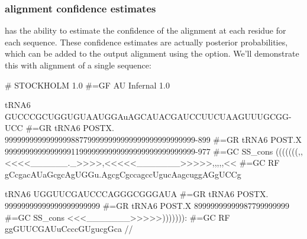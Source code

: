 \subsubsection{alignment confidence estimates}
 has the ability to estimate the confidence of the
alignment at each residue for each sequence. These confidence estimates
are actually posterior probabilities, which can be added to
the output alignment using the  option. We'll demonstrate
this with alignment of a single sequence:

{\samepage
\begin{sreoutput}
# STOCKHOLM 1.0
#=GF AU Infernal 1.0

tRNA6             GUCCCGCUGGUGUAAUGGAuAGCAUACGAUCCUUCUAAGUUUGCGG-UCC
#=GR tRNA6 POSTX. 9999999999999999887799999999999999999999999999-899
#=GR tRNA6 POST.X 9999999999999999119999999999999999999999999999-977
#=GC SS_cons      (((((((,,<<<<______._>>>>,<<<<<_______>>>>>,,,,,<<
#=GC RF           gCcgacAUaGcgcAgUGGu.AgcgCgccagccUgucAagcuggAGgUCCg

tRNA6             UGGUUCGAUCCCAGGGCGGGAUA
#=GR tRNA6 POSTX. 99999999999999999999999
#=GR tRNA6 POST.X 89999999999987799999999
#=GC SS_cons      <<<_______>>>>>))))))):
#=GC RF           ggGUUCGAUuCcccGUgucgGca
//
\end{sreoutput}
}

